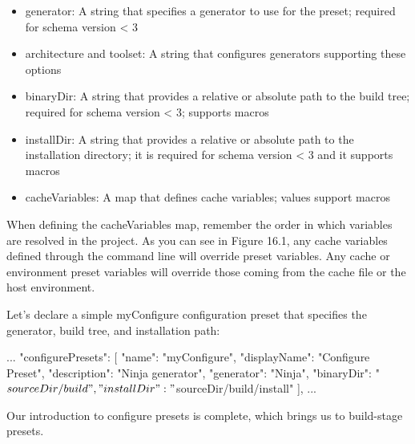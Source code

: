 \begin{itemize}
\item
generator: A string that specifies a generator to use for the preset; required for schema version < 3

\item
architecture and toolset: A string that configures generators supporting these options

\item
binaryDir: A string that provides a relative or absolute path to the build tree; required for schema version < 3; supports macros

\item
installDir: A string that provides a relative or absolute path to the installation directory; it is required for schema version < 3 and it supports macros

\item
cacheVariables: A map that defines cache variables; values support macros
\end{itemize}

When defining the cacheVariables map, remember the order in which variables are resolved in the project. As you can see in Figure 16.1, any cache variables defined through the command line will override preset variables. Any cache or environment preset variables will override those coming from the cache file or the host environment.


Let’s declare a simple myConfigure configuration preset that specifies the generator, build tree, and installation path:


\begin{json}
...
    "configurePresets": [
        {
            "name": "myConfigure",
            "displayName": "Configure Preset",
            "description": "Ninja generator",
            "generator": "Ninja",
            "binaryDir": "${sourceDir}/build",
            "installDir": "${sourceDir}/build/install"
        }
    ],
...
\end{json}

Our introduction to configure presets is complete, which brings us to build-stage presets.


